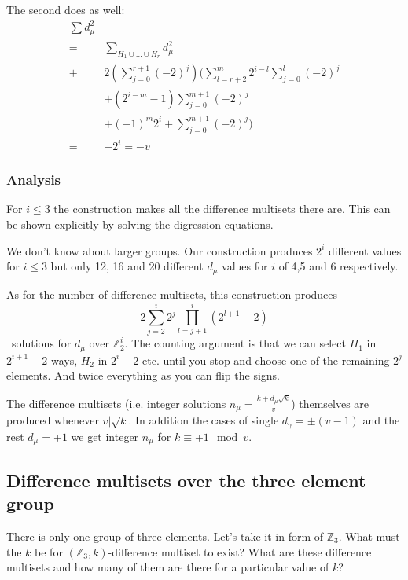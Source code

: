         The second does as well:
        \begin{equation}
            \begin{split}
                \sum d_\mu^2 & \\
                = & \sum\limits_{H_1 \cup \ldots \cup H_r} d_\mu^2 \\
                + & 2 \left(\sum\limits_{j=0}^{r+1} (-2)^j \right) 
                 \Bigg(
                    \sum\limits_{l=r+2}^{m} 2^{i-l} \sum\limits_{j=0}^l (-2)^j \\
                   & + (2^{i-m}-1)\sum\limits_{j=0}^{m+1} (-2)^j \\
                   & + (-1)^m 2^i + \sum\limits_{j=0}^{m+1} (-2)^j
                 \Bigg) \\
                = & - 2^i = -v
            \end{split}
        \end{equation}
    
    \subsubsection{Analysis}
        For $i \leq 3$ the construction makes all the difference multisets there are. This can be shown explicitly by solving the digression equations.
        
        We don't know about larger groups. Our construction produces $2^i$ different values for $i \leq 3$ but only 12, 16 and 20 different $d_\mu$ values for $i$ of 4,5 and 6 respectively.
        
        As for the number of difference multisets, this construction produces
        \begin{equation}
            2 \sum\limits_{j=2}^i 2^j \prod\limits_{l=j+1}^i (2^{l+1}-2)
        \end{equation}\
        solutions for $d_\mu$ over $\mathbb Z_2^i$. The counting argument is that we can select $H_1$ in $2^{i+1}-2$ ways, $H_2$ in $2^i-2$ etc. until you stop and choose one of the remaining $2^j$ elements. And twice everything as you can flip the signs.
        
        The difference multisets (i.e. integer solutions $n_\mu=\frac{k+d_\mu \sqrt k}v$) themselves are produced whenever $v | \sqrt k$. In addition the cases of single $d_\gamma = \pm (v-1)$ and the rest $d_\mu = \mp 1$ we get integer $n_\mu$ for $k \equiv \mp 1 \mod v$.
        
\subsection{Difference multisets over the three element group}
    \label{sec:z3}
    There is only one group of three elements. Let's take it in form of $\mathbb Z_3$. What must the $k$ be for $(\mathbb Z_3,k)$-difference multiset to exist? What are these difference multisets and how many of them are there for a particular value of $k$?

